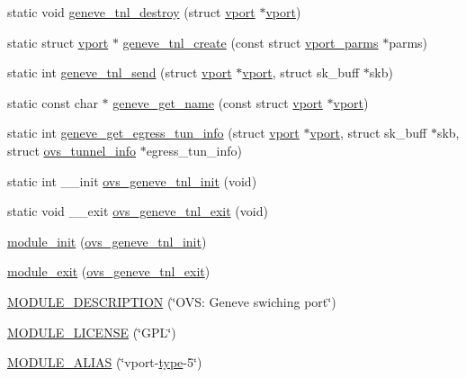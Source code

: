 \begin{DoxyCompactItemize}
\item 
static void \hyperlink{vport-geneve_8c_ab0a5d6fd5319e6c71acd2af4bde2c833}{geneve\+\_\+tnl\+\_\+destroy} (struct \hyperlink{structvport}{vport} $\ast$\hyperlink{structvport}{vport})
\item 
static struct \hyperlink{structvport}{vport} $\ast$ \hyperlink{vport-geneve_8c_a6b9a4a56d5a598c17c0bbfffce774798}{geneve\+\_\+tnl\+\_\+create} (const struct \hyperlink{structvport__parms}{vport\+\_\+parms} $\ast$parms)
\item 
static int \hyperlink{vport-geneve_8c_af7cfa0fa94438ef4fddf79129f8346d4}{geneve\+\_\+tnl\+\_\+send} (struct \hyperlink{structvport}{vport} $\ast$\hyperlink{structvport}{vport}, struct sk\+\_\+buff $\ast$skb)
\item 
static const char $\ast$ \hyperlink{vport-geneve_8c_a8f9770cc8d8fc8fad0f6f05a783513df}{geneve\+\_\+get\+\_\+name} (const struct \hyperlink{structvport}{vport} $\ast$\hyperlink{structvport}{vport})
\item 
static int \hyperlink{vport-geneve_8c_aed60d6de8f65dc856030e1ff6196b198}{geneve\+\_\+get\+\_\+egress\+\_\+tun\+\_\+info} (struct \hyperlink{structvport}{vport} $\ast$\hyperlink{structvport}{vport}, struct sk\+\_\+buff $\ast$skb, struct \hyperlink{structovs__tunnel__info}{ovs\+\_\+tunnel\+\_\+info} $\ast$egress\+\_\+tun\+\_\+info)
\item 
static int \+\_\+\+\_\+init \hyperlink{vport-geneve_8c_a250fcfc7da979abfb351d5290b7ae319}{ovs\+\_\+geneve\+\_\+tnl\+\_\+init} (void)
\item 
static void \+\_\+\+\_\+exit \hyperlink{vport-geneve_8c_a8fcdbd3154bb84fb2ab88296a0bd03c7}{ovs\+\_\+geneve\+\_\+tnl\+\_\+exit} (void)
\item 
\hyperlink{vport-geneve_8c_a67da53b39bd67cb2fe98ebf15b882489}{module\+\_\+init} (\hyperlink{vport-geneve_8c_a250fcfc7da979abfb351d5290b7ae319}{ovs\+\_\+geneve\+\_\+tnl\+\_\+init})
\item 
\hyperlink{vport-geneve_8c_a77ee305130afe983aa92a926c6e91f88}{module\+\_\+exit} (\hyperlink{vport-geneve_8c_a8fcdbd3154bb84fb2ab88296a0bd03c7}{ovs\+\_\+geneve\+\_\+tnl\+\_\+exit})
\item 
\hyperlink{vport-geneve_8c_afa1a2e7e8154bcd5ff96b22a9153cd52}{M\+O\+D\+U\+L\+E\+\_\+\+D\+E\+S\+C\+R\+I\+P\+T\+I\+O\+N} (\char`\"{}O\+V\+S\+: Geneve swiching port\char`\"{})
\item 
\hyperlink{vport-geneve_8c_ad94b36675e7eb067ea3ce6ff9e244a44}{M\+O\+D\+U\+L\+E\+\_\+\+L\+I\+C\+E\+N\+S\+E} (\char`\"{}G\+P\+L\char`\"{})
\item 
\hyperlink{vport-geneve_8c_a6f89164187509105f25d6071184282d7}{M\+O\+D\+U\+L\+E\+\_\+\+A\+L\+I\+A\+S} (\char`\"{}vport-\/\hyperlink{flow_8h_ab22aaab04f806700def00f32823fcb9e}{type}-\/5\char`\"{})
\end{DoxyCompactItemize}


